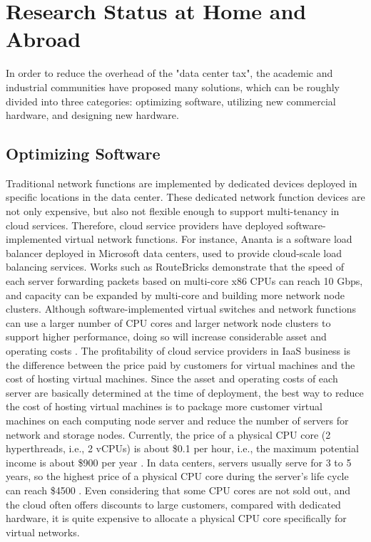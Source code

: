 \section{Research Status at Home and Abroad}

In order to reduce the overhead of the "data center tax", the academic and industrial communities have proposed many solutions, which can be roughly divided into three categories: optimizing software, utilizing new commercial hardware, and designing new hardware.

\subsection{Optimizing Software}
\label{background:sec:software}

Traditional network functions are implemented by dedicated devices deployed in specific locations in the data center. These dedicated network function devices are not only expensive, but also not flexible enough to support multi-tenancy in cloud services. 
Therefore, cloud service providers have deployed software-implemented virtual network functions. For instance, Ananta \cite {ananta} is a software load balancer deployed in Microsoft data centers, used to provide cloud-scale load balancing services.
Works such as RouteBricks \cite {routebricks} demonstrate that the speed of each server forwarding packets based on multi-core x86 CPUs can reach 10 Gbps, and capacity can be expanded by multi-core and building more network node clusters.
Although software-implemented virtual switches and network functions can use a larger number of CPU cores and larger network node clusters to support higher performance, doing so will increase considerable asset and operating costs \cite {ananta,duet}.
The profitability of cloud service providers in IaaS business is the difference between the price paid by customers for virtual machines and the cost of hosting virtual machines.
Since the asset and operating costs of each server are basically determined at the time of deployment, the best way to reduce the cost of hosting virtual machines is to package more customer virtual machines on each computing node server and reduce the number of servers for network and storage nodes.
Currently, the price of a physical CPU core (2 hyperthreads, i.e., 2 vCPUs) is about \$0.1 per hour, i.e., the maximum potential income is about \$900 per year \cite{smartnic}.
In data centers, servers usually serve for 3 to 5 years, so the highest price of a physical CPU core during the server's life cycle can reach \$4500 \cite{smartnic}.
Even considering that some CPU cores are not sold out, and the cloud often offers discounts to large customers, compared with dedicated hardware, it is quite expensive to allocate a physical CPU core specifically for virtual networks.

